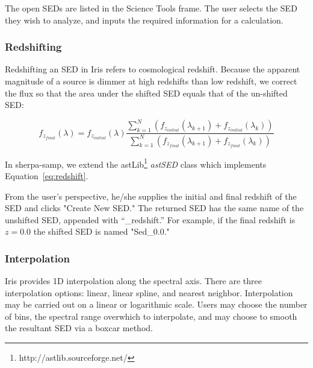 The open SEDs are listed in the Science Tools frame. The user selects the SED they wish to analyze, and inputs the required information for a calculation.

\subsubsection{Redshifting}
Redshifting an SED in Iris refers to cosmological redshift. Because the apparent magnitude of a source is dimmer at high redshifts than low redshift, we correct the flux so that the area under the shifted SED equals that of the un-shifted SED:

\begin{equation} \label{eq:redshift}
f_{z_{final}}(\lambda) = f_{z_{initial}}(\lambda) \frac{\sum_{k=1}^N (f_{z_{initial}}(\lambda_{k+1})+f_{z_{initial}}(\lambda_{k}))}{\sum_{k=1}^N (f_{z_{final}}(\lambda_{k+1})+f_{z_{final}}(\lambda_{k}))}
\end{equation}

In sherpa-samp, we extend the astLib\footnote{http://astlib.sourceforge.net/} \textit{astSED} class which implements Equation~\ref{eq:redshift}. 

From the user's perspective, he/she supplies the initial and final redshift of the SED and clicks "Create New SED." The returned SED has the same name of the unshifted SED, appended with ``\_redshift.'' For example, if the final redshift is \(z=0.0\) the shifted SED is named "Sed\_0.0."

\subsubsection{Interpolation}
Iris provides 1D interpolation along the spectral axis. There are three interpolation options: linear, linear spline, and nearest neighbor. Interpolation may be carried out on a linear or logarithmic scale. Users may choose the number of bins, the spectral range overwhich to interpolate, and may choose to smooth the resultant SED via a boxcar method.

